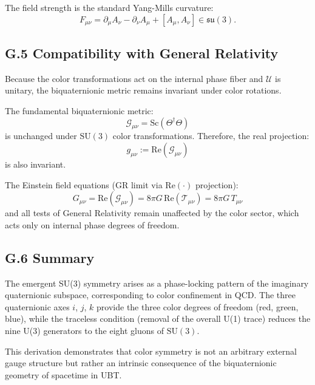 The field strength is the standard Yang-Mills curvature:
\begin{equation}
F_{\mu\nu} = \partial_\mu A_\nu - \partial_\nu A_\mu + [A_\mu, A_\nu] \in \mathfrak{su}(3).
\end{equation}

\subsection*{G.5 Compatibility with General Relativity}

Because the color transformations act on the internal phase fiber and $\mathcal{U}$ is unitary, the biquaternionic metric remains invariant under color rotations. 

The fundamental biquaternionic metric:
\begin{equation}
\mathcal{G}_{\mu\nu} = \mathrm{Sc}(\Theta^\dagger \Theta)
\end{equation}
is unchanged under $\mathrm{SU}(3)$ color transformations. Therefore, the real projection:
\begin{equation}
g_{\mu\nu} := \mathrm{Re}(\mathcal{G}_{\mu\nu})
\end{equation}
is also invariant.

The Einstein field equations (GR limit via $\mathrm{Re}(\cdot)$ projection):
\begin{equation}
G_{\mu\nu} = \mathrm{Re}(\mathcal{G}_{\mu\nu}) = 8\pi G\, \mathrm{Re}(\mathcal{T}_{\mu\nu}) = 8\pi G\, T_{\mu\nu}
\end{equation}
and all tests of General Relativity remain unaffected by the color sector, which acts only on internal phase degrees of freedom.

\subsection*{G.6 Summary}

The emergent SU(3) symmetry arises as a phase-locking pattern of the imaginary quaternionic subspace, corresponding to color confinement in QCD. The three quaternionic axes $i$, $j$, $k$ provide the three color degrees of freedom (red, green, blue), while the traceless condition (removal of the overall U(1) trace) reduces the nine U(3) generators to the eight gluons of $\mathrm{SU}(3)$.

This derivation demonstrates that color symmetry is not an arbitrary external gauge structure but rather an intrinsic consequence of the biquaternionic geometry of spacetime in UBT.

